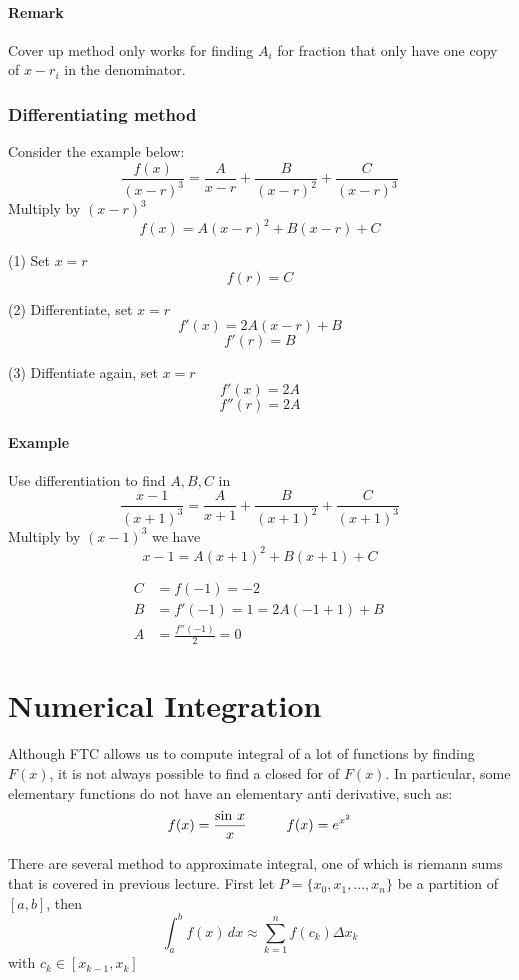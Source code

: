 \documentclass[12pt]{article}
\newcommand\tab[1][1cm]{\hspace*{#1}}
\begin{document}
\paragraph{Remark} Cover up method only works for finding $A_i$ for fraction that only have one copy of $x - r_i$ in the denominator.
\subsubsection{Differentiating method}
Consider the example below:
\[
    \frac{f(x)}{(x - r)^3} = \frac{A}{x - r} + \frac{B}{(x - r)^2} + \frac{C}{(x - r)^3} 
\]
Multiply by $(x - r)^3$
\[
    f(x) = A(x - r)^2 + B(x - r) + C
\]

(1) Set $x = r$
\[
    f(r) = C
\]

(2) Differentiate, set $x = r$
\[
    f'(x) = 2A(x - r) + B 
\]
\[
    f'(r) = B
\]

(3) Diffentiate again, set $x = r$
\[
    f'(x) = 2A
\]
\[
    f''(r) = 2A
\]

\paragraph{Example} Use differentiation to find $A, B, C$ in
\[
    \frac{x - 1}{(x + 1)^3} = \frac{A}{x + 1} + \frac{B}{(x + 1)^2} + \frac{C}{(x + 1)^3}  
\]
Multiply by $(x - 1)^3$ we have
\[
    x - 1 = A(x + 1)^2 + B(x + 1) + C
\]

\begin{align*} 
    C &= f( - 1) = - 2 \\
    B &= f'( - 1) = 1 = 2A( - 1 + 1) + B\, \\ 
    A &= \frac{f''( - 1)}{2} = 0
\end{align*}

\section{Numerical Integration}
Although FTC allows us to compute integral of a lot of functions by finding $F(x)$, it is not always possible to find a closed for of $F(x)$.
In particular, some elementary functions do not have an elementary anti derivative, such as:
\[
    f(x) = \frac{\sin\, x}{x} \textrm{\tab} f(x) = e^{x^2} 
\]

There are several method to approximate integral, one of which is riemann sums that is covered in previous lecture.
First let $P = \{x_0, x_1, ..., x_n\}$ be a partition of $[a, b]$, then  
\[
    \int_a^b f(x) \, dx \approx \sum_{k = 1}^n f(c_k) \Delta x_k
\]
with $c_k \in [x_{k - 1}, x_{k}]$
\end{document}
